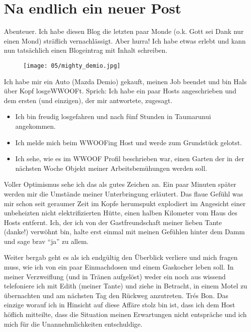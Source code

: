 \chapter{Na endlich ein neuer Post}

Abenteuer. Ich habe diesen Blog die letzten paar Monde (o.k. Gott sei
Dank nur einen Mond) sträflich vernachlässigt. Aber hurra! Ich habe
etwas erlebt und kann nun tatsächlich einen Blogeintrag mit Inhalt
schreiben.

\begin{figure}[h]
  \centering
  \texttt{[image: 05/mighty\_demio.jpg]}
\end{figure}

Ich habe mir ein Auto (Mazda Demio) gekauft, meinen Job beendet und bin
Hals über Kopf losgeWWOOFt. Sprich: Ich habe ein paar Hosts
angeschrieben und dem ersten (und einzigen), der mir antwortete,
zugesagt.

\begin{itemize}
\tightlist
\item
  Ich bin freudig losgefahren und nach fünf Stunden in Taumarunui
  angekommen.
\item
  Ich melde mich beim WWOOFing Host und werde zum Grundstück gelotst.
\item
  Ich sehe, wie es im WWOOF Profil beschrieben war, einen Garten der in
  der nächsten Woche Objekt meiner Arbeitsbemühungen werden soll.
\end{itemize}

Voller Optimismus sehe ich das als gutes Zeichen an. Ein paar Minuten
später werden mir die Umstände meiner Unterbringung erläutert. Das
flaue Gefühl was mir schon seit geraumer Zeit im Kopfe herumspukt
explodiert im Angesicht einer unbeheizten nicht elektrifizierten
Hütte, einen halben Kilometer vom Haus des Hosts entfernt. Ich, der
ich von der Gastfreundschaft meiner lieben Tante (danke!) verwöhnt
bin, halte erst einmal mit meinen Gefühlen hinter dem Damm und sage
brav ``ja'' zu allem.

Weiter bergab geht es als ich endgültig den Überblick verliere und
mich fragen muss, wie ich von ein paar Einmachdosen und einem
Gaskocher leben soll. In meiner Verzweiflung (und in Tränen aufgelöst)
weder ein noch aus wissend telefoniere ich mit Edith (meiner Tante)
und ziehe in Betracht, in einem Motel zu übernachten und am nächsten
Tag den Rückweg anzutreten. Trés Bon. Das einzige worauf ich in
Hinsicht auf diese Affäre stolz bin ist, dass ich dem Host höflich
mitteilte, dass die Situation meinen Erwartungen nicht entspräche und
ich mich für die Unannehmlichkeiten entschuldige.

